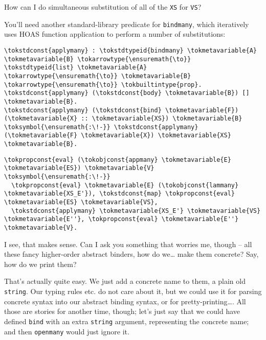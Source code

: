 \noindent
How can I do simultaneous substitution of all of the \texttt{XS} for
\texttt{VS}?

\heroADVISOR{} You'll need another standard-library predicate for
\texttt{bindmany}, which iteratively uses HOAS function application to
perform a number of substitutions:

\importantCodeblock{}

\begin{verbatim}
\tokstdconst{applymany} : \tokstdtypeid{bindmany} \tokmetavariable{A} \tokmetavariable{B} \tokarrowtype{\ensuremath{\to}} \tokstdtypeid{list} \tokmetavariable{A} \tokarrowtype{\ensuremath{\to}} \tokmetavariable{B} \tokarrowtype{\ensuremath{\to}} \tokbuiltintype{prop}.
\tokstdconst{applymany} (\tokstdconst{body} \tokmetavariable{B}) [] \tokmetavariable{B}.
\tokstdconst{applymany} (\tokstdconst{bind} \tokmetavariable{F}) (\tokmetavariable{X} :: \tokmetavariable{XS}) \tokmetavariable{B} \toksymbol{\ensuremath{:\!-}} \tokstdconst{applymany} (\tokmetavariable{F} \tokmetavariable{X}) \tokmetavariable{XS} \tokmetavariable{B}.
\end{verbatim}

\importantCodeblockEnd{}

\importantCodeblock{}

\begin{verbatim}
\tokpropconst{eval} (\tokobjconst{appmany} \tokmetavariable{E} \tokmetavariable{ES}) \tokmetavariable{V} \toksymbol{\ensuremath{:\!-}}
  \tokpropconst{eval} \tokmetavariable{E} (\tokobjconst{lammany} \tokmetavariable{XS_E'}), \tokstdconst{map} \tokpropconst{eval} \tokmetavariable{ES} \tokmetavariable{VS},
  \tokstdconst{applymany} \tokmetavariable{XS_E'} \tokmetavariable{VS} \tokmetavariable{E''}, \tokpropconst{eval} \tokmetavariable{E''} \tokmetavariable{V}.
\end{verbatim}

\importantCodeblockEnd{}

\heroSTUDENT{} I see, that makes sense. Can I ask you something that worries
me, though -- all these fancy higher-order abstract binders, how do
we\ldots{} make them concrete? Say, how do we print them?

\heroADVISOR{} That's actually quite easy. We just add a concrete name to
them, a plain old \texttt{string}. Our typing rules etc. do not care
about it, but we could use it for parsing concrete syntax into our
abstract binding syntax, or for pretty-printing\ldots{}. All those are
stories for another time, though; let's just say that we could have
defined \texttt{bind} with an extra \texttt{string} argument,
representing the concrete name; and then \texttt{openmany} would just
ignore it.

